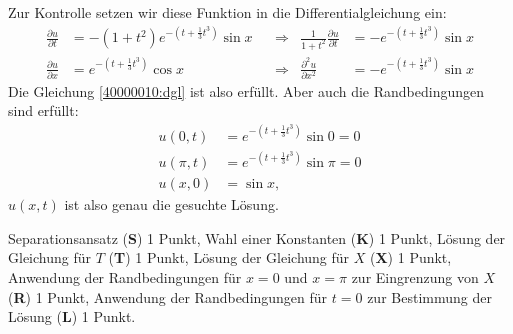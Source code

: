 \begin{diskussion}
Zur Kontrolle setzen wir diese Funktion in die Differentialgleichung
ein:
\begin{align*}
\frac{\partial u}{\partial t}&=
-(1+t^2)
e^{-(t+\frac13t^3)}
\sin x
&&\Rightarrow&
\frac1{1+t^2}\frac{\partial u}{\partial t}&=
-e^{-(t+\frac13t^3)}
\sin x
\\
\frac{\partial u}{\partial x}&=
e^{-(t+\frac13t^3)}
\cos x
&&\Rightarrow&
\frac{\partial^2 u}{\partial x^2}&=
-e^{-(t+\frac13t^3)}
\sin x
\end{align*}
Die Gleichung \eqref{40000010:dgl} ist also erfüllt.
Aber auch die Randbedingungen sind erfüllt:
\begin{align*}
u(0,t)&=e^{-(t+\frac13t^3)}\sin 0=0\\
u(\pi,t)&=e^{-(t+\frac13t^3)}\sin\pi=0\\
u(x,0)&=\sin x,
\end{align*}
$u(x,t)$ ist also genau die gesuchte Lösung.
\end{diskussion}

\begin{bewertung}
Separationsansatz ({\bf S}) 1 Punkt,
Wahl einer Konstanten ({\bf K}) 1 Punkt,
Lösung der Gleichung für $T$ ({\bf T}) 1 Punkt,
Lösung der Gleichung für $X$ ({\bf X}) 1 Punkt,
Anwendung der Randbedingungen für $x=0$ und $x=\pi$
zur Eingrenzung von $X$ ({\bf R}) 1 Punkt,
Anwendung der Randbedingungen für $t=0$ zur Bestimmung
der Lösung ({\bf L}) 1 Punkt.
\end{bewertung}


